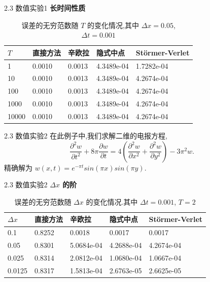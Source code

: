 \documentclass{beamer}
\begin{document}
\begin{frame}{2.3 数值实验1}
\textbf{长时间性质}

\begin{table}[h]
  \centering
\caption{误差的无穷范数随 $T$ 的变化情况,其中 $\Delta x=0.05$, $\Delta t=0.001$}
\begin{tabularx}{\linewidth}{XXXXX}
 \hline
 $T$ &直接方法 & 辛欧拉 & 隐式中点 & St\"{o}rmer-Verlet\\
 \hline
 1 & 0.0010 & 0.0013 & 4.3489e-04 & 1.7282e-04 \\
 10 & 0.0010 & 0.0013 & 4.3489e-04 & 4.2674e-04 \\
 100 & 0.0010 & 0.0013 & 4.3489e-04 & 4.2674e-04 \\
 1000 & 0.0010 & 0.0013 & 4.3489e-04 & 4.2674e-04 \\
 10000 & 0.0010 & 0.0013 & 4.3489e-04 & 4.2674e-04 \\
 \hline
\end{tabularx}
  \label{tab:t1}
\end{table}
\end{frame}

\begin{frame}{2.3 数值实验2}
在此例子中,我们求解二维的电报方程,
\begin{equation*}
\frac{\partial ^2 w}{\partial t^2}+8\pi \frac{\partial w}{\partial
t}=4 (\frac{\partial ^2 w}{\partial x^2} + \frac{\partial ^2
w}{\partial y^2}) -3\pi^2 w.
\end{equation*}
精确解为 $w(x,t) = e^{-\pi t}sin(\pi x)sin(\pi y)$.
\end{frame}

\begin{frame}{2.3 数值实验2}
\textbf{$\Delta x$ 的阶}

\begin{table}[h!]
  \centering
\caption{误差的无穷范数随 $\Delta x$ 的变化情况.其中 $\Delta t=0.001$, $T=2$}
\begin{tabularx}{\linewidth}{XXXXX}
 \hline
 $\Delta x$ &直接方法 & 辛欧拉 & 隐式中点 & St\"{o}rmer-Verlet\\
 \hline
 0.1 & 0.8252 & 0.0018 & 0.0017 & 0.0017\\
 0.05 & 0.8301 & 5.0684e-04 & 4.2688e-04 & 4.2674e-04\\
 0.025 & 0.8314 & 2.0812e-04 & 1.0680e-04 & 1.0667e-04\\
 0.0125 & 0.8317 & 1.5813e-04 & 2.6763e-05 & 2.6625e-05\\
 \hline
\end{tabularx}
  \label{tab:dx3}
\end{table}
\end{frame}
\end{document}
